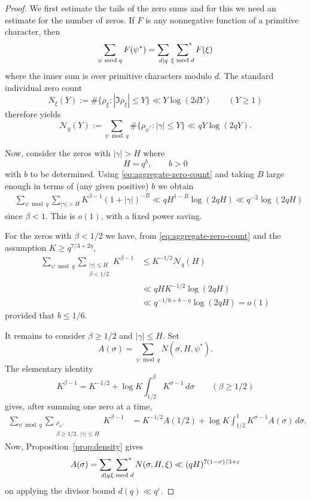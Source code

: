 \documentclass[10pt,a4paper]{amsart}
\newcommand{\eps}{\varepsilon}
\newcommand{\geqs}{\geqslant }
\newcommand{\leqs}{\leqslant }
\begin{document}
\begin{proof}
We first estimate the tails of the zero sums and for this we need an estimate for the number of zeros. If $F$ is any
nonnegative function of a primitive character, then
\begin{equation*}
 \sum_{\psi\bmod q}F(\psi^*)
 =\sum_{d\mid q}\ \sideset{}{^*}\sum_{\xi\bmod d}F(\xi)
\end{equation*}
where the inner sum is over primitive characters modulo $d$. The
standard individual zero count
\[
 N_\xi(Y):=\#\{\rho_\xi:|\Im\rho_\xi|\leqs Y\}
 \ll Y\log(2dY) \qquad (Y\geqs1)
\]
therefore yields
\begin{equation}
 \mathcal N_q(Y):=
 \sum_{\psi\bmod q}
 \#\{\rho_{\psi^*}:|\gamma|\leqs Y\}
 \ll qY\log(2qY).
 \label{eq:aggregate-zero-count}
\end{equation}


Now, consider the zeros with $|\gamma|>H$ where  
\[
H=q^b,\qquad b>0
\] 
with $b$ to be determined.
Using
\eqref{eq:aggregate-zero-count} and taking $B$ large enough in terms of (any given positive) $b$ we obtain
\begin{align*}
 &\sum_{\psi\bmod q}\sum_{|\gamma|>H}
 K^{\beta-1}(1+|\gamma|)^{-B}
 \ll qH^{1-B}\log(2qH)
 \ll q^{-2}\log(2qH)
\end{align*}
since $\beta<1$. This is $o(1)$, with a fixed power saving.

For the zeros with $\beta<1/2$ we have, from
\eqref{eq:aggregate-zero-count} and the assumption $K\geqs q^{7/3+2\eta}$,
\begin{equation*}\begin{split}
 \sum_{\psi\bmod q}
 \sum_{\substack{|\gamma|\leqs H\\\beta<1/2}}K^{\beta-1}
 &\leqs K^{-1/2}\mathcal N_q(H) \\
 &\ll qHK^{-1/2}\log(2qH) \\
 &\ll q^{-1/6+b-\eta}\log(2qH)=o(1)
 \label{eq:left-zero-range}
\end{split}
\end{equation*}
provided that $b\leqs1/6$.

It remains to consider $\beta\geqs1/2$ and $|\gamma|\leqs H$.  Set
\[
 A(\sigma)=\sum_{\psi\bmod q}N(\sigma,H,\psi^*).
\]
The elementary identity
\[
 K^{\beta-1}=K^{-1/2}
 +\log K\int_{1/2}^{\beta}K^{\sigma-1}\,d\sigma
 \qquad (\beta\geqs1/2)
\]
gives, after summing one zero at a time,
\begin{align}
{\sum_{\psi\bmod q}}
   {\sum_{\substack{\rho_{\psi^*}\\
          \beta\geqs1/2,\ |\gamma|\leqs H}}}K^{\beta-1}
 &=K^{-1/2}A(1/2)
 +\log K\int_{1/2}^{1}K^{\sigma-1}A(\sigma)\,d\sigma.
 \label{eq:layer-cake-identity}
\end{align}
Now, Proposition~\ref{prop:density} gives 
\begin{equation}
 A(\sigma)
 =
 \sum_{d|q}\sideset{}{^*}\sum_{\xi\bmod d}N(\sigma,H,\xi)
 \ll (qH)^{7(1-\sigma)/3+\eps}
 \label{eq:density-in-prime-proof}
\end{equation}
on applying the divisor bound $d(q)\ll q^\eps$. 


\end{proof}
\end{document}
